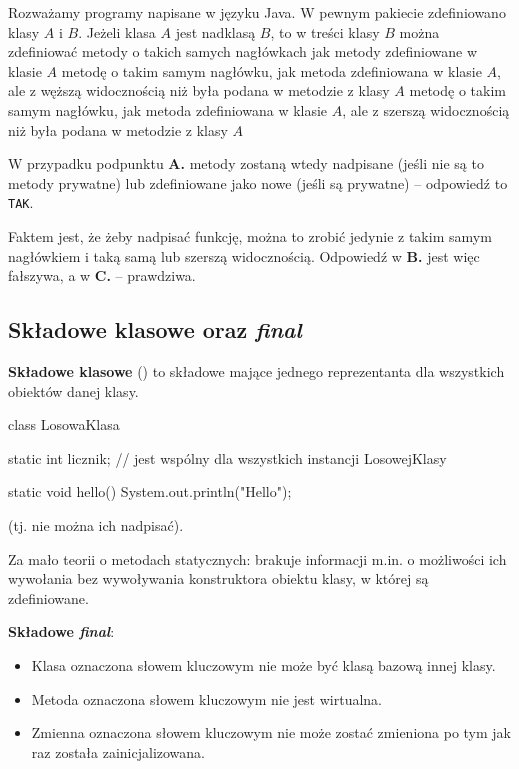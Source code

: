 \begin{exam}
    Rozważamy programy napisane w języku Java. W pewnym pakiecie zdefiniowano klasy $A$ i $B$. Jeżeli klasa $A$ jest nadklasą $B$, to w treści klasy $B$ można zdefiniować
    \answers
    {metody o takich samych nagłówkach jak metody zdefiniowane w klasie $A$}
    {metodę o takim samym nagłówku, jak metoda zdefiniowana w klasie $A$, ale z węższą widocznością niż była podana w metodzie z klasy $A$}
    {metodę o takim samym nagłówku, jak metoda zdefiniowana w klasie $A$, ale z szerszą widocznością niż była podana w metodzie z klasy $A$}
    \bigskip

    W przypadku podpunktu \textbf{A.} metody zostaną wtedy nadpisane (jeśli nie są to metody prywatne) lub zdefiniowane jako nowe (jeśli są prywatne) -- odpowiedź to \texttt{TAK}.

    Faktem jest, że żeby nadpisać funkcję, można to zrobić jedynie z takim samym nagłówkiem i taką samą lub szerszą widocznością. Odpowiedź w \textbf{B.} jest więc fałszywa, a w \textbf{C.} -- prawdziwa.
\end{exam}

\subsection{Składowe klasowe oraz \textit{final}}
\textbf{Składowe klasowe} () to składowe mające jednego reprezentanta dla wszystkich obiektów danej klasy.
\begin{java}
    class LosowaKlasa {
        static int licznik; // jest wspólny dla wszystkich instancji LosowejKlasy

        static void hello() {
            System.out.println("Hello");
        }
    }
\end{java}
 (tj. nie można ich nadpisać).

\begin{editorsnote}
    Za mało teorii o metodach statycznych: brakuje informacji m.in. o możliwości ich wywołania bez wywoływania konstruktora obiektu klasy, w której są zdefiniowane.
\end{editorsnote}
\bigskip

\textbf{Składowe \textit{final}}:
\begin{itemize}
    \item Klasa oznaczona słowem kluczowym  nie może być klasą bazową innej klasy.
    \item Metoda oznaczona słowem kluczowym  nie jest wirtualna.
    \item Zmienna oznaczona słowem kluczowym  nie może zostać zmieniona po tym jak raz została zainicjalizowana.
\end{itemize}

